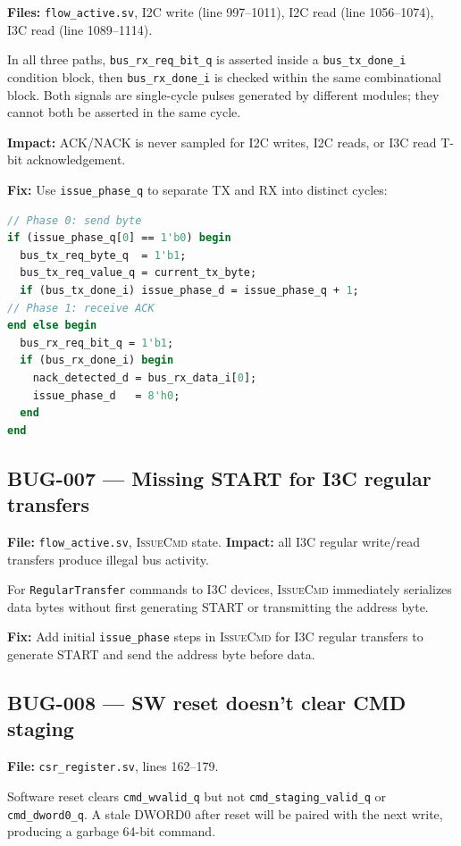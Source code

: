 \documentclass[12pt, a4paper, oneside]{report}
\newcommand{\signal}[1]{\texttt{#1}}
\newcommand{\file}[1]{\texttt{#1}}
\newcommand{\state}[1]{\textsc{#1}}
\begin{document}
\textbf{Files:} \file{flow\_active.sv}, I2C write (line 997--1011), I2C read
(line 1056--1074), I3C read (line 1089--1114).

In all three paths, \signal{bus\_rx\_req\_bit\_q} is asserted inside a
\signal{bus\_tx\_done\_i} condition block, then \signal{bus\_rx\_done\_i} is
checked within the same combinational block. Both signals are single-cycle pulses
generated by different modules; they cannot both be asserted in the same cycle.

\textbf{Impact:} ACK/NACK is never sampled for I2C writes, I2C reads, or I3C read
T-bit acknowledgement.

\textbf{Fix:} Use \signal{issue\_phase\_q} to separate TX and RX into distinct cycles:

\begin{lstlisting}[language=SystemVerilog]
// Phase 0: send byte
if (issue_phase_q[0] == 1'b0) begin
  bus_tx_req_byte_q  = 1'b1;
  bus_tx_req_value_q = current_tx_byte;
  if (bus_tx_done_i) issue_phase_d = issue_phase_q + 1;
// Phase 1: receive ACK
end else begin
  bus_rx_req_bit_q = 1'b1;
  if (bus_rx_done_i) begin
    nack_detected_d = bus_rx_data_i[0];
    issue_phase_d   = 8'h0;
  end
end
\end{lstlisting}

\subsection*{BUG-007 --- Missing START for I3C regular transfers}

\textbf{File:} \file{flow\_active.sv}, \state{IssueCmd} state. \textbf{Impact:}
all I3C regular write/read transfers produce illegal bus activity.

For \texttt{RegularTransfer} commands to I3C devices, \state{IssueCmd} immediately
serializes data bytes without first generating START or transmitting the address byte.

\textbf{Fix:} Add initial \signal{issue\_phase} steps in \state{IssueCmd} for I3C
regular transfers to generate START and send the address byte before data.

\subsection*{BUG-008 --- SW reset doesn't clear CMD staging}

\textbf{File:} \file{csr\_register.sv}, lines 162--179.

Software reset clears \signal{cmd\_wvalid\_q} but not \signal{cmd\_staging\_valid\_q}
or \signal{cmd\_dword0\_q}. A stale DWORD0 after reset will be paired with the next
write, producing a garbage 64-bit command.
\end{document}
